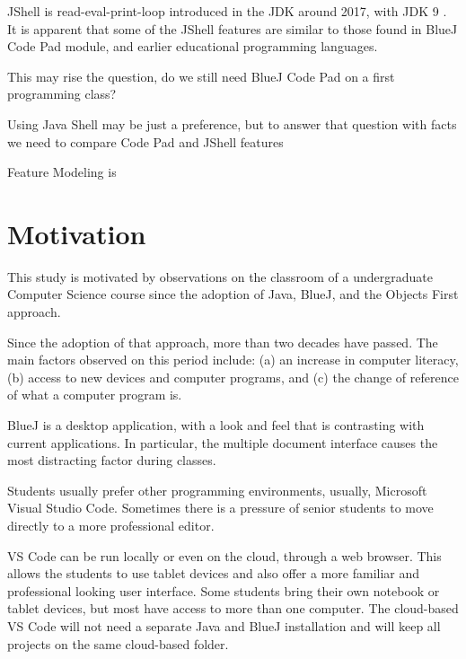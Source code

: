 \documentclass{article}
\begin{document}

JShell is read-eval-print-loop introduced in the JDK around 2017, with JDK 9 \cite{jshell_docs}. It is apparent that some of the JShell features are similar to those found in BlueJ Code Pad module, and earlier educational programming languages. 

This may rise the question, do we still need BlueJ Code Pad on a first programming class?


Using Java Shell may be just a preference, but to answer that question with facts we need to 
compare Code Pad and JShell features

Feature Modeling is

\section{Motivation}

This study is motivated by observations on the classroom of a undergraduate Computer Science course since the adoption of Java, BlueJ, and the Objects First approach.

Since the adoption of that approach, more than two decades have passed. The main factors observed on this period include: (a) an increase in computer literacy, (b) access to new devices and computer programs, and (c) the change of reference of what a computer program is.

BlueJ is a desktop application, with a look and feel that is contrasting with current applications. In particular, the multiple document interface causes the most distracting factor during classes.

Students usually prefer other programming environments, usually, Microsoft Visual Studio Code. Sometimes there is a pressure of senior students to move directly to a more professional editor. 


VS Code can be run locally or even on the cloud, through a web browser. This allows the students to use tablet devices and also offer a more familiar and professional looking user interface. Some students bring their own notebook or tablet devices, but most have access to more than one computer. The cloud-based VS Code will not need a separate Java and BlueJ installation and will keep all projects on the same cloud-based folder.
\end{document}

